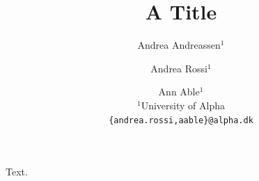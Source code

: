 \documentclass{article}
\title{A Title}
\author{%
  Andrea Andreassen$^{1}$ \and
  Andrea Rossi$^{1}$ \and
  Ann Able$^{1}$ \\
 {\normalfont $^1$University of Alpha} \\
 \texttt{\{andrea.rossi,aable\}@alpha.dk}
}
\begin{document}
\maketitle
Text.
\end{document}
